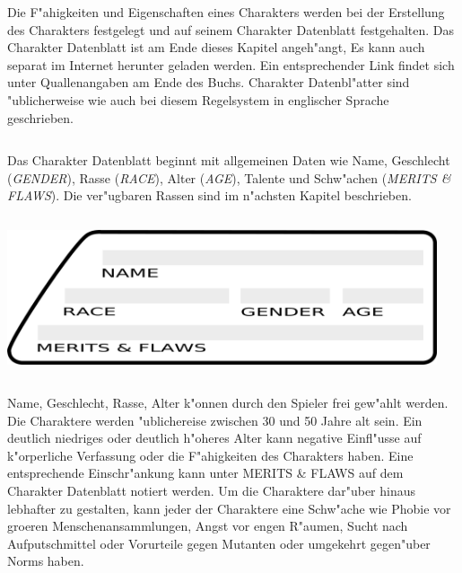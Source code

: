 Die F"ahigkeiten und Eigenschaften eines Charakters werden bei der Erstellung des Charakters festgelegt und auf seinem Charakter Datenblatt festgehalten. Das Charakter Datenblatt ist am Ende dieses Kapitel angeh"angt, Es kann auch separat im Internet herunter geladen werden. Ein entsprechender Link findet sich unter Quallenangaben am Ende des Buchs. Charakter Datenbl"atter sind "ublicherweise wie auch bei diesem Regelsystem in englischer Sprache geschrieben.


\begin{column}[l]{0.48}
    Das Charakter Datenblatt beginnt mit allgemeinen Daten wie Name, Geschlecht (\emph{GENDER}), Rasse (\emph{RACE}), Alter (\emph{AGE}), Talente und Schw"achen (\emph{MERITS \& FLAWS}). Die ver"ugbaren Rassen sind im n"achsten Kapitel beschrieben.
\end{column}
\begin{column}[r]{0.52}
    \centering
    \includegraphics[width=0.95\textwidth]{images/character_base_stats}
    \medskip   
\end{column}
\medskip

Name, Geschlecht, Rasse, Alter k"onnen durch den Spieler frei gew"ahlt werden. Die Charaktere werden "ublichereise zwischen 30 und 50 Jahre alt sein. Ein deutlich niedriges oder deutlich h"oheres Alter kann negative Einfl"usse auf k"orperliche Verfassung oder die F"ahigkeiten des Charakters haben. Eine entsprechende Einschr"ankung kann unter MERITS \& FLAWS auf dem Charakter Datenblatt notiert werden. Um die Charaktere dar"uber hinaus lebhafter zu gestalten, kann jeder der Charaktere eine Schw"ache wie Phobie vor gro\3eren Menschenansammlungen, Angst vor engen R"aumen, Sucht nach Aufputschmittel oder Vorurteile gegen Mutanten oder umgekehrt gegen"uber Norms haben.

